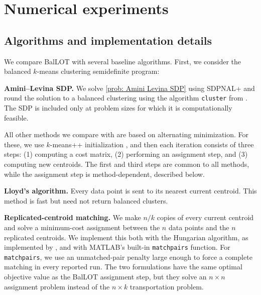 \documentclass{article}
\theoremstyle{plain}
\theoremstyle{definition}
\newcommand{\1}{\mathbf{1}}
\newcommand{\bmu}{\bm{\mu}}
\begin{document}
\section{Numerical experiments}
\label{sec: numerical experiments}



\subsection{Algorithms and implementation details}

We compare BalLOT with several baseline algorithms.
First, we consider the balanced $k$-means clustering semidefinite program:

\medskip
\noindent
\textbf{Amini--Levina SDP.}
We solve \eqref{prob: Amini Levina SDP} using SDPNAL+ and round the solution to a balanced clustering using the algorithm \texttt{cluster} from \cite{fei2022hidden}.
The SDP is included only at problem sizes for which it is computationally feasible.

\medskip

All other methods we compare with are based on alternating minimization.
For these, we use $k$-means++ initialization \cite{arthur2007kmeanspp}, and then each iteration consists of three steps: (1) computing a cost matrix, (2) performing an assignment step, and (3) computing new centroids.
The first and third steps are common to all methods, while the assignment step is method-dependent, described below.


\medskip
\noindent
\textbf{Lloyd's algorithm.}
Every data point is sent to its nearest current centroid.
This method is fast but need not return balanced clusters.

\medskip
\noindent
\textbf{Replicated-centroid matching.}
We make $n/k$ copies of every current centroid and solve a minimum-cost assignment between the $n$ data points and the $n$ replicated centroids.
We implement this both with the Hungarian algorithm, as implemented by \cite{Cao2025Hungarian}, and with MATLAB's built-in \texttt{matchpairs} function.
For \texttt{matchpairs}, we use an unmatched-pair penalty large enough to force a complete matching in every reported run.
The two formulations have the same optimal objective value as the BalLOT assignment step, but they solve an $n\times n$ assignment problem instead of the $n\times k$ transportation problem.
\end{document}
